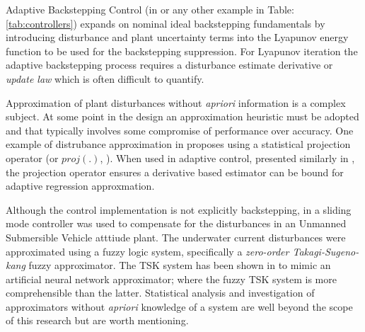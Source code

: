 \par
Adaptive Backstepping Control (in \cite{backstepping} or any other example in Table:\ref{tab:controllers}) expands on nominal ideal backstepping fundamentals by introducing disturbance and plant uncertainty terms into the Lyapunov energy function to be used for the backstepping suppression. For Lyapunov iteration the adaptive backstepping process requires a disturbance estimate derivative or \emph{update law} which is often difficult to quantify.
\par
Approximation of plant disturbances without \emph{apriori} information is a complex subject. At some point in the design an approximation heuristic must be adopted and that typically involves some compromise of performance over accuracy. One example of distrubance approximation in \cite{nonlinearadaptive} proposes using a statistical projection operator (or $proj(.)$, \cite{adaptiveregulation}). When used in adaptive control, presented similarly in \cite{outputfeedback}, the projection operator ensures a derivative based estimator can be bound for adaptive regression approxmation\cite{nonlinearregression}.
\par
Although the control implementation is not explicitly backstepping, in \cite{adaptiveslidingmode} a sliding mode controller was used to compensate for the disturbances in an Unmanned Submersible Vehicle atttiude plant. The underwater current disturbances were approximated using a fuzzy logic system, specifically a \emph{zero-order Takagi-Sugeno-kang} fuzzy approximator. The TSK system has been shown in \cite{zeroTSK} to mimic an artificial neural network approximator; where the fuzzy TSK system is more comprehensible than the latter. Statistical analysis and investigation of approximators without \emph{apriori} knowledge of a system are well beyond the scope of this research but are worth mentioning.
